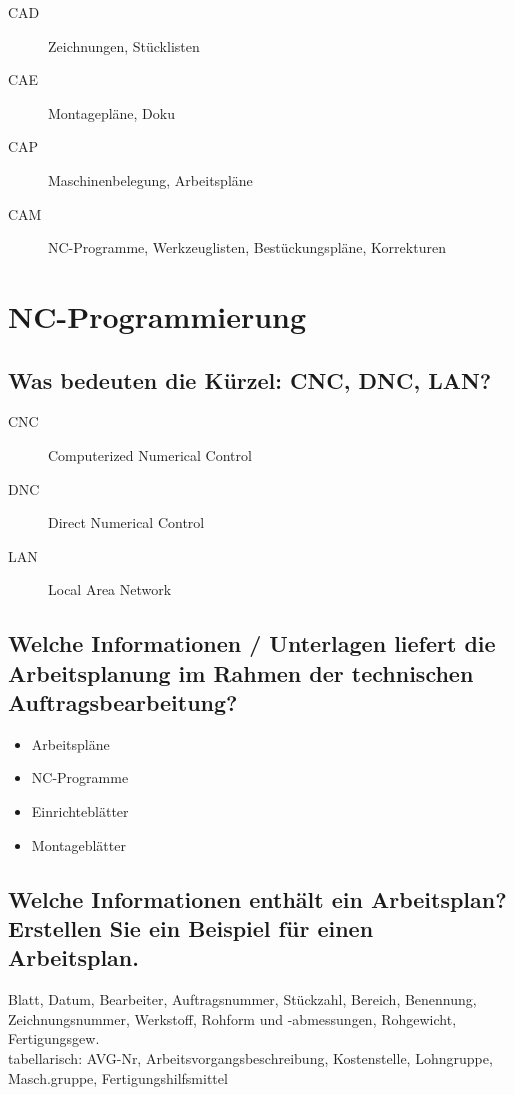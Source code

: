 \begin{description}
    \item[CAD] Zeichnungen, Stücklisten
    \item[CAE] Montagepläne, Doku
    \item[CAP] Maschinenbelegung, Arbeitspläne
    \item[CAM] NC-Programme, Werkzeuglisten, Bestückungspläne, Korrekturen
\end{description}

\newpage

\section{NC-Programmierung}

\subsection*{Was bedeuten die Kürzel: CNC, DNC, LAN?}

\begin{description}
    \item[CNC] Computerized Numerical Control
    \item[DNC] Direct Numerical Control
    \item[LAN] Local Area Network
\end{description}

\subsection*{Welche Informationen / Unterlagen liefert die Arbeitsplanung im Rahmen der technischen Auftragsbearbeitung?}

\begin{itemize}
    \item Arbeitspläne
    \item NC-Programme
    \item Einrichteblätter
    \item Montageblätter
\end{itemize}

\subsection*{Welche Informationen enthält ein Arbeitsplan? Erstellen Sie ein Beispiel für einen Arbeitsplan.}

Blatt, Datum, Bearbeiter, Auftragsnummer, Stückzahl, Bereich, Benennung, Zeichnungsnummer, Werkstoff, Rohform und -abmessungen, Rohgewicht, Fertigungsgew. \\
tabellarisch: AVG-Nr, Arbeitsvorgangsbeschreibung, Kostenstelle, Lohngruppe, Masch.gruppe, 
Fertigungshilfsmittel


